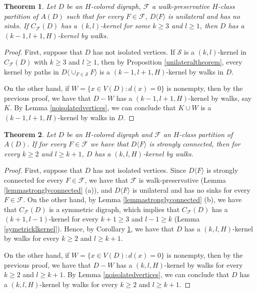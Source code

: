 \documentclass[10pt,a4paper]{article}
\newtheorem{theorem}{Theorem}[section]
\begin{document}
\begin{theorem}
\label{corunilat}
Let $D$ be an $H$-colored digraph, $\mathscr{F}$ a walk-preservative $H$-class partition of $A(D)$ such that for every $F \in \mathscr{F}$, $D\langle F \rangle$ is unilateral and has no sinks. If  $C_{\mathscr{F}}(D)$ has a $(k,l)$-kernel for some $k \geq 3$ and $l \geq 1$, then $D$ has a $(k-1,l+1,H)$-kernel by walks.
\end{theorem}
\begin{proof}
First, suppose that $D$ has not isolated vertices. If $\mathcal{S}$ is a $(k,l)$-kernel in $C_{\mathscr{F}}(D)$ with $k \geq 3$ and $l \geq 1$, then by Proposition \ref{unilateraltheorem}, every kernel by paths in $D \langle \cup _{F \in \mathcal{S}}F \rangle$ is a $(k-1,l+1,H)$-kernel by walks in $D$.

On the other hand, if $W=\{x\in V(D) : d(x) =0\}$ is nonempty, then by the previous proof, we have that $D - W$ has a $(k-1,l +1 ,H)$-kernel by walks, say $K$. By Lemma \ref{noisolatedvertices}, we can conclude that $K \cup W$ is a $(k-1, l+1,H)$-kernel by walks in $D$.
\end{proof}

\begin{theorem}
\label{Teostrong}
Let $D$ be an $H$-colored digraph and $\mathscr{F}$ an $H$-class partition of $A(D)$. If for every $F \in \mathscr{F}$ we have that $D\langle F \rangle $ is strongly connected, then for every $k \geq 2$ and $l \geq k+1$,  $D$ has a $(k,l, H)$-kernel by walks.
\end{theorem}
\begin{proof}
First, suppose that $D$ has not isolated vertices. Since $D\langle F \rangle $ is strongly connected for every $F \in \mathscr{F}$, we have that $\mathscr{F}$ is walk-preservative (Lemma \ref{lemmastronglyconnected} (a)),  and $D \langle F \rangle$ is unilateral and has no sinks  for every $F \in \mathscr{F}$. 
On the other hand, by Lemma \ref{lemmastronglyconnected} (b), we have that  $C_{\mathscr{F}}(D)$ is a symmetric digraph, which implies that $C_{\mathscr{F}}(D)$ has a $(k+1, l-1)$-kernel for every $k +1 \geq 3$ and $l -1 \geq k $ (Lemma \ref{symetricklkernel}). Hence, by Corollary  \ref{corunilat}, we have that $D$ has a $(k, l, H)$-kernel by walks for every $k \geq 2$ and $l \geq k+1$. 

On the other hand, if $W=\{x\in V(D) : d(x) =0\}$ is nonempty, then by the previous proof, we have that $D - W$ has a $(k,l ,H)$-kernel by walks for every $k \geq 2$ and $l \geq k +1$. By Lemma \ref{noisolatedvertices}, we can conclude that $D$ has a $(k,l, H)$-kernel by walks for every $k \geq 2$ and $l \geq k+1$.
\end{proof}
\end{document}
